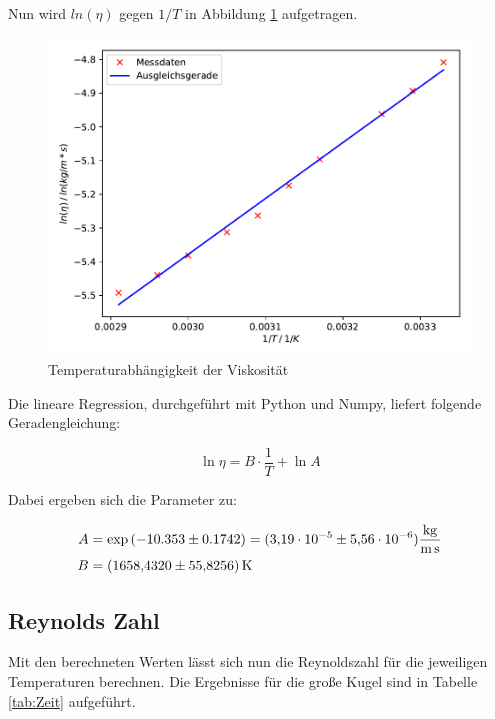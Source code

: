 Nun wird $ln(\eta)$ gegen $1/T$ in Abbildung \ref{fig:plot} aufgetragen.

\begin{figure}
  \centering
  \includegraphics[scale=0.7]{content/plot1.pdf}
  \caption{Temperaturabhängigkeit der Viskosität}
  \label{fig:plot}
\end{figure}

Die lineare Regression, durchgeführt mit Python und Numpy, 
liefert folgende Geradengleichung: 

\begin{equation}
\ln{\eta} = B\cdot \frac{1}{T} + \ln{A}
\end{equation}

Dabei ergeben sich die Parameter zu: 

\begin{align*}
A &= \exp{(-10.353\pm0.1742)} = (\num{3.19e-5}\pm\num{5.56e-6})\si{\kilo\gram\per\meter\per\second} \\
B &= \SI{1658.432+-55.8256}{\kelvin}
\end{align*}

\subsection{Reynolds Zahl}

Mit den berechneten Werten lässt sich nun die Reynoldszahl für die 
jeweiligen Temperaturen berechnen. Die Ergebnisse für die große Kugel sind 
in Tabelle \ref{tab:Zeit} aufgeführt.

